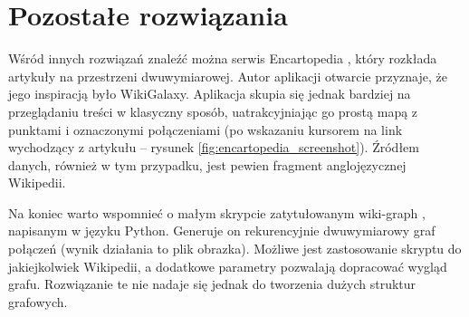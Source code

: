 \section{Pozostałe rozwiązania}

Wśród innych rozwiązań znaleźć można serwis Encartopedia \cite{Encartopedia}, który rozkłada artykuły na przestrzeni dwuwymiarowej. Autor aplikacji otwarcie przyznaje, że jego inspiracją było WikiGalaxy. Aplikacja skupia się jednak bardziej na przeglądaniu treści w klasyczny sposób, uatrakcyjniając go prostą mapą z punktami i oznaczonymi połączeniami (po wskazaniu kursorem na link wychodzący z artykułu – rysunek \ref{fig:encartopedia_screenshot}). Źródłem danych, również w tym przypadku, jest pewien fragment anglojęzycznej Wikipedii.


Na koniec warto wspomnieć o małym skrypcie zatytułowanym wiki-graph \cite{WikiGraphPython}, napisanym w języku Python. Generuje on rekurencyjnie dwuwymiarowy graf połączeń (wynik działania to plik obrazka). Możliwe jest zastosowanie skryptu do jakiejkolwiek Wikipedii, a dodatkowe parametry pozwalają dopracować wygląd grafu. Rozwiązanie te nie nadaje się jednak do tworzenia dużych struktur grafowych.
